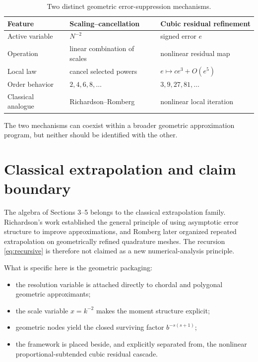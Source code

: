 \documentclass[11pt]{article}
\theoremstyle{remark}
\begin{document}
\begin{table}[ht]
\centering
\caption{Two distinct geometric error-suppression mechanisms.}
\label{tab:comparison}
\begin{tabular}{@{}lll@{}}
\toprule
Feature & Scaling--cancellation & Cubic residual refinement \\
\midrule
Active variable & $N^{-2}$ & signed error $e$ \\
Operation & linear combination of scales & nonlinear residual map \\
Local law & cancel selected powers & $e\mapsto ce^3+O(e^5)$ \\
Order behavior & $2,4,6,8,\ldots$ & $3,9,27,81,\ldots$ \\
Classical analogue & Richardson--Romberg & nonlinear local iteration \\
\bottomrule
\end{tabular}
\end{table}

The two mechanisms can coexist within a broader geometric approximation
program, but neither should be identified with the other.

\section{Classical extrapolation and claim boundary}

The algebra of Sections 3--5 belongs to the classical extrapolation family.
Richardson's work established the general principle of using asymptotic error
structure to improve approximations, and Romberg later organized repeated
extrapolation on geometrically refined quadrature meshes.  The recursion
\eqref{eq:recursive} is therefore not claimed as a new numerical-analysis
principle.

What is specific here is the geometric packaging:
\begin{itemize}
\item the resolution variable is attached directly to chordal and polygonal
geometric approximants;
\item the scale variable $x=k^{-2}$ makes the moment structure explicit;
\item geometric nodes yield the closed surviving factor
$b^{-s(s+1)}$;
\item the framework is placed beside, and explicitly separated from, the
nonlinear proportional-subtended cubic residual cascade.
\end{itemize}
\end{document}
